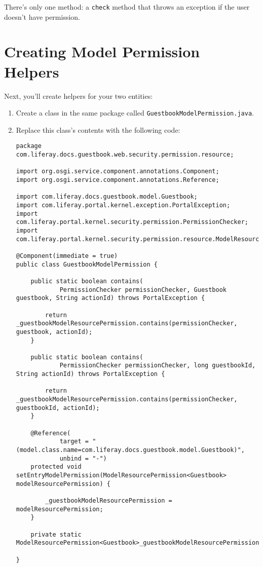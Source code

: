 There's only one method: a \texttt{check} method that throws an
exception if the user doesn't have permission.

\section{Creating Model Permission
Helpers}\label{creating-model-permission-helpers}

Next, you'll create helpers for your two entities:

\begin{enumerate}
\def\labelenumi{\arabic{enumi}.}
\item
  Create a class in the same package called
  \texttt{GuestbookModelPermission.java}.
\item
  Replace this class's contents with the following code:

\begin{verbatim}
package com.liferay.docs.guestbook.web.security.permission.resource;

import org.osgi.service.component.annotations.Component;
import org.osgi.service.component.annotations.Reference;

import com.liferay.docs.guestbook.model.Guestbook;
import com.liferay.portal.kernel.exception.PortalException;
import com.liferay.portal.kernel.security.permission.PermissionChecker;
import com.liferay.portal.kernel.security.permission.resource.ModelResourcePermission;

@Component(immediate = true)
public class GuestbookModelPermission {

    public static boolean contains(
            PermissionChecker permissionChecker, Guestbook guestbook, String actionId) throws PortalException {

        return _guestbookModelResourcePermission.contains(permissionChecker, guestbook, actionId);
    }

    public static boolean contains(
            PermissionChecker permissionChecker, long guestbookId, String actionId) throws PortalException {

        return _guestbookModelResourcePermission.contains(permissionChecker, guestbookId, actionId);
    }

    @Reference(
            target = "(model.class.name=com.liferay.docs.guestbook.model.Guestbook)",
            unbind = "-")
    protected void setEntryModelPermission(ModelResourcePermission<Guestbook> modelResourcePermission) {

        _guestbookModelResourcePermission = modelResourcePermission;
    }

    private static ModelResourcePermission<Guestbook>_guestbookModelResourcePermission;

}
\end{verbatim}
\end{enumerate}

